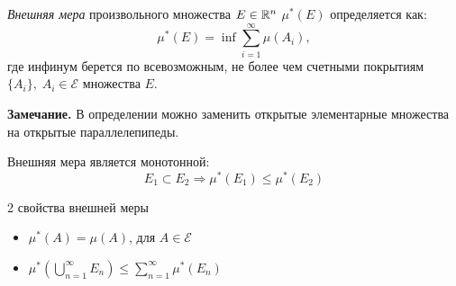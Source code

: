 \begin{definition}
  \textit{Внешняя мера} произвольного множества $E \in \mathbb{R}^n$ $\mu^*(E)$ определяется как:
  $$\mu^*(E) = \inf \sum_{i = 1}^{\infty} \mu(A_i),$$
  где инфинум берется по всевозможным, не более чем счетными покрытиям
  $\{A_i\},\; A_i \in \mathcal{E}$ множества $E$.
\end{definition}

\textbf{Замечание.} В определении можно заменить открытые элементарные множества на открытые параллелепипеды.

\begin{lemma}
  Внешняя мера является монотонной:
  $$E_1 \subset E_2 \Rightarrow \mu^*(E_1) \leq \mu^*(E_2)$$
\end{lemma}

2 свойства внешней меры
\begin{itemize}
  \item $\mu^*(A) = \mu(A)$, для $A \in \mathcal{E}$
  \item $\mu^*\left( \bigcup_{n = 1}^{\infty} E_n \right) \leq \sum_{n=1}^{\infty} \mu^*(E_n)$
\end{itemize}

